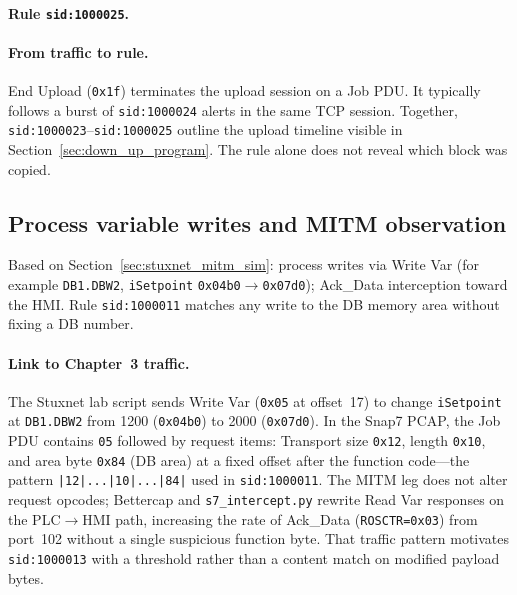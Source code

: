 \paragraph{Rule \texttt{sid:1000025}.}

\paragraph{From traffic to rule.}
End Upload (\texttt{0x1f}) terminates the upload session on a Job PDU. It typically follows a burst of \texttt{sid:1000024} alerts in the same TCP session. Together, \texttt{sid:1000023}--\texttt{sid:1000025} outline the upload timeline visible in Section~\ref{sec:down_up_program}. The rule alone does not reveal which block was copied.

\subsection{Process variable writes and MITM observation}
\label{sec:rules-stuxnet}

Based on Section~\ref{sec:stuxnet_mitm_sim}: process writes via Write Var (for example \texttt{DB1.DBW2}, \texttt{iSetpoint} \texttt{0x04b0}$\rightarrow$\texttt{0x07d0}); Ack\_Data interception toward the HMI. Rule \texttt{sid:1000011} matches any write to the DB memory area without fixing a DB number.

\paragraph{Link to Chapter~3 traffic.}
The Stuxnet lab script sends Write Var (\texttt{0x05} at offset~17) to change \texttt{iSetpoint} at \texttt{DB1.DBW2} from 1200 (\texttt{0x04b0}) to 2000 (\texttt{0x07d0}). In the Snap7 PCAP, the Job PDU contains \texttt{05} followed by request items: Transport size \texttt{0x12}, length \texttt{0x10}, and area byte \texttt{0x84} (DB area) at a fixed offset after the function code---the pattern \texttt{|12|...|10|...|84|} used in \texttt{sid:1000011}. The MITM leg does not alter request opcodes; Bettercap and \texttt{s7\_intercept.py} rewrite Read Var responses on the PLC$\rightarrow$HMI path, increasing the rate of Ack\_Data (\texttt{ROSCTR=0x03}) from port~102 without a single suspicious function byte. That traffic pattern motivates \texttt{sid:1000013} with a threshold rather than a content match on modified payload bytes.

